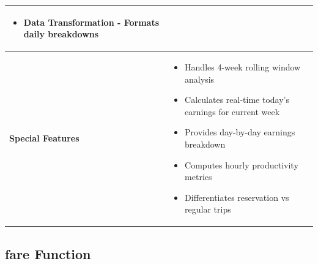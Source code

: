 \documentclass[11pt,a4paper]{article}
\begin{document}
\begin{longtable}{|p{3cm}|p{12cm}|}
\begin{itemize}[nosep]
\item Data Transformation - Formats daily breakdowns
\end{itemize} \\
\hline
\textbf{Special Features} & 
\begin{itemize}[nosep]
\item Handles 4-week rolling window analysis
\item Calculates real-time today's earnings for current week
\item Provides day-by-day earnings breakdown
\item Computes hourly productivity metrics
\item Differentiates reservation vs regular trips
\end{itemize} \\
\hline
\end{longtable}

\subsection{fare Function}
\end{document}
